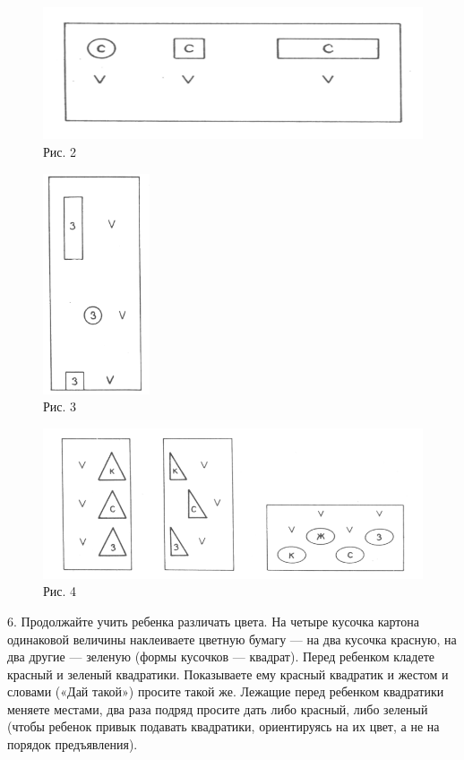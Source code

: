 \documentclass[a5paper]{book}
\begin{document}
\begin{figure}
\centering
\includegraphics[width=\linewidth]{media/media/image2.png}
\caption*{Рис. 2}
\end{figure}

\begin{figure}
\centering
\includegraphics[width=1.24028in,height=2.56319in]{media/media/image3.jpg}
\caption*{Рис. 3}
\end{figure}


\begin{figure}
\centering
\includegraphics[width=\linewidth]{media/media/image4.png} 
\caption*{Рис. 4}
\end{figure}

6. Продолжайте учить ребенка различать цвета. На четыре кусочка картона
одинаковой величины наклеиваете цветную бумагу --- на два кусочка
красную, на два другие --- зеленую (формы кусочков --- квадрат). Перед
ребенком кладете красный и зеленый квадратики. Показываете ему красный
квадратик и жестом и словами («Дай такой») просите такой же. Лежащие
перед ребенком квадратики меняете местами, два раза подряд просите дать
либо красный, либо зеленый (чтобы ребенок привык подавать квадратики,
ориентируясь на их цвет, а не на порядок предъявления).
\end{document}
